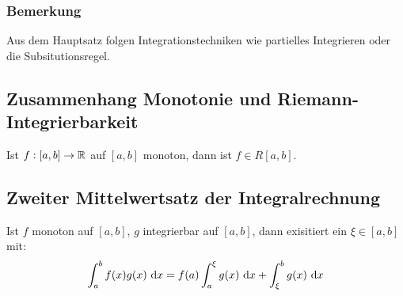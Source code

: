 \subsubsection{Bemerkung}
Aus dem Hauptsatz folgen Integrationstechniken wie partielles Integrieren oder
die Subsitutionsregel.

\subsection{Zusammenhang Monotonie und Riemann-Integrierbarkeit}
Ist $f: [a, b] \rightarrow \mathbb{R}$ auf $[a,b]$ monoton, dann ist $f \in R[a,b]$.

\subsection{Zweiter Mittelwertsatz der Integralrechnung}
Ist $f$ monoton auf $[a,b]$, $g$ integrierbar auf $[a,b]$, dann exisitiert ein
$\xi \in [a,b]$ mit:
\begin{equation*}
    \int_a^b f(x)g(x) \text{ d}x = f(a) \int_a^\xi g(x) \text{ d}x +
        \int_\xi^b g(x) \text{ d}x
\end{equation*}
